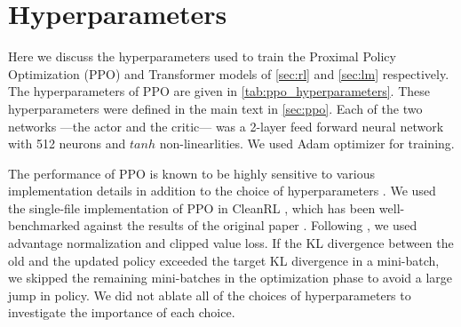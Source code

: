 
\section{Hyperparameters}\label{app:hyperparameters}

Here we discuss the hyperparameters used to train the Proximal Policy Optimization (PPO) and Transformer models of \autoref{sec:rl} and \autoref{sec:lm} respectively.
The hyperparameters of PPO are given in \autoref{tab:ppo_hyperparameters}. These hyperparameters were defined in the main text in \autoref{sec:ppo}. Each of the two networks ---the actor and the critic--- was a 2-layer feed forward neural network with 512 neurons and $tanh$ non-linearlities. We used Adam optimizer for training.


The performance of PPO is known to be highly sensitive to various implementation details in addition to the choice of hyperparameters \cite{shengyi2022the37implementation, engstrom2020implementation}. We used the single-file implementation of PPO in CleanRL \cite{huang2022cleanrl}, which has been well-benchmarked against the results of the original paper \cite{schulman2017proximal}. Following \cite{engstrom2020implementation}, we used advantage normalization and clipped value loss. If the KL divergence between the old and the updated policy exceeded the target KL divergence in a mini-batch, we skipped the remaining mini-batches in the optimization phase to avoid a large jump in policy.
We did not ablate all of the choices of hyperparameters to investigate the importance of each choice.

